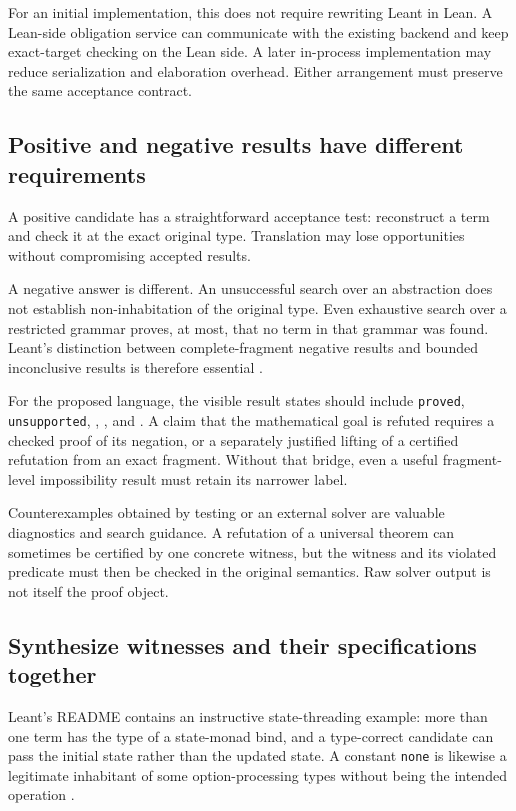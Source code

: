 \documentclass[11pt,a4paper]{article}
\newcommand{\codeid}[1]{\nolinkurl{#1}}
\begin{document}
For an initial implementation, this does not require rewriting Leant in Lean. A Lean-side obligation service can communicate with the existing backend and keep exact-target checking on the Lean side. A later in-process implementation may reduce serialization and elaboration overhead. Either arrangement must preserve the same acceptance contract.

\subsection{Positive and negative results have different requirements}

A positive candidate has a straightforward acceptance test: reconstruct a term and check it at the exact original type. Translation may lose opportunities without compromising accepted results.

A negative answer is different. An unsuccessful search over an abstraction does not establish non-inhabitation of the original type. Even exhaustive search over a restricted grammar proves, at most, that no term in that grammar was found. Leant's distinction between complete-fragment negative results and bounded inconclusive results is therefore essential \cite{leantreadme,leantfragment}.

For the proposed language, the visible result states should include \codeid{proved}, \codeid{unsupported}, \texttt{}, \texttt{}, and \texttt{}. A claim that the mathematical goal is refuted requires a checked proof of its negation, or a separately justified lifting of a certified refutation from an exact fragment. Without that bridge, even a useful fragment-level impossibility result must retain its narrower label.

Counterexamples obtained by testing or an external solver are valuable diagnostics and search guidance. A refutation of a universal theorem can sometimes be certified by one concrete witness, but the witness and its violated predicate must then be checked in the original semantics. Raw solver output is not itself the proof object.

\subsection{Synthesize witnesses and their specifications together}

Leant's README contains an instructive state-threading example: more than one term has the type of a state-monad bind, and a type-correct candidate can pass the initial state rather than the updated state. A constant \codeid{none} is likewise a legitimate inhabitant of some option-processing types without being the intended operation \cite{leantreadme}.
\end{document}
